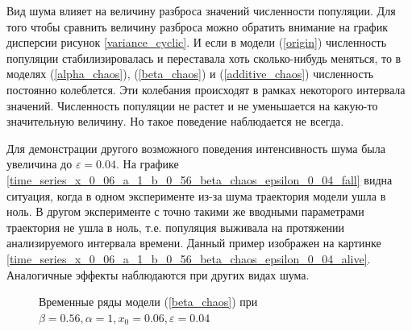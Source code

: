     Вид шума влияет на величину разброса значений численности популяции. Для того чтобы сравнить величину разброса можно обратить внимание на график дисперсии рисунок \ref{variance_cyclic}. И если в модели (\ref{origin}) численность популяции стабилизировалась и переставала хоть сколько-нибудь меняться, то в моделях (\ref{alpha_chaos}), (\ref{beta_chaos}) и (\ref{additive_chaos}) численность постоянно колеблется. Эти колебания происходят в рамках некоторого интервала значений. Численность популяции не растет и не уменьшается на какую-то значительную величину. Но такое поведение наблюдается не всегда.

    Для демонстрации другого возможного поведения интенсивность шума была увеличина до \(\varepsilon = 0.04\). На графике \ref{time_series_x_0_06_a_1_b_0_56_beta_chaos_epsilon_0_04_fall} видна ситуация, когда в одном эксперименте из-за шума траектория модели ушла в ноль. В другом эксперименте с точно такими же вводными параметрами траектория не ушла в ноль, т.е. популяция выживала на протяжении анализируемого интервала времени. Данный пример изображен на картинке \ref{time_series_x_0_06_a_1_b_0_56_beta_chaos_epsilon_0_04_alive}. Аналогичные эффекты наблюдаются при других видах шума.

    \begin{figure}
        \centering
        
        \caption{Временные ряды модели (\ref{beta_chaos}) при \(\beta = 0.56, \alpha = 1, x_0 = 0.06, \varepsilon = 0.04\)}
    \end{figure}


